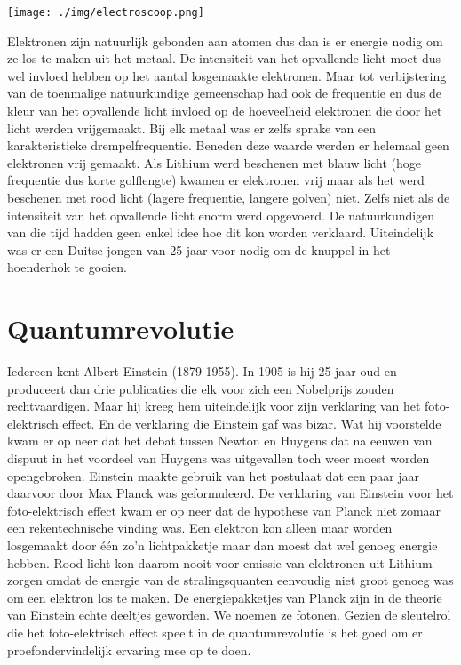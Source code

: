{\begin{center}
\leavevmode
\texttt{[image: ./img/electroscoop.png]}
\end{center}

Elektronen zijn natuurlijk gebonden aan atomen dus dan is er energie nodig om ze los te maken uit het metaal. De intensiteit van het opvallende licht moet dus wel invloed hebben op het aantal losgemaakte elektronen. Maar tot verbijstering van de toenmalige natuurkundige gemeenschap had ook de frequentie en dus de kleur van het opvallende licht invloed op de hoeveelheid elektronen die door het licht werden vrijgemaakt. Bij elk metaal was er zelfs sprake van een karakteristieke drempelfrequentie. Beneden deze waarde werden er helemaal geen elektronen vrij gemaakt. Als Lithium werd beschenen met blauw licht (hoge frequentie dus korte golflengte) kwamen er elektronen vrij maar als het werd beschenen met rood licht (lagere frequentie, langere golven) niet. Zelfs niet als de intensiteit van het opvallende licht enorm werd opgevoerd. De natuurkundigen van die tijd hadden geen enkel idee hoe dit kon worden verklaard. Uiteindelijk was er een Duitse jongen van 25 jaar voor nodig om de knuppel in het hoenderhok te gooien.

\section{Quantumrevolutie}
Iedereen kent Albert Einstein (1879-1955). In 1905 is hij 25 jaar oud en produceert dan drie publicaties die elk voor zich een Nobelprijs zouden rechtvaardigen. Maar hij kreeg hem uiteindelijk voor zijn verklaring van het foto-elektrisch effect. En de verklaring die Einstein gaf was bizar. Wat hij voorstelde kwam er op neer dat het debat tussen Newton en Huygens dat na eeuwen van dispuut in het voordeel van Huygens was uitgevallen toch weer moest worden opengebroken. Einstein maakte gebruik van het postulaat dat een paar jaar daarvoor door Max Planck was geformuleerd. De verklaring van Einstein voor het foto-elektrisch effect kwam er op neer dat de hypothese van Planck niet zomaar een rekentechnische vinding was. Een elektron kon alleen maar worden losgemaakt door \'e\'en zo'n lichtpakketje maar dan moest dat wel genoeg energie hebben. Rood licht kon daarom nooit voor emissie van elektronen uit Lithium zorgen omdat de energie van de stralingsquanten eenvoudig niet groot genoeg was om een elektron los te maken. 
De energiepakketjes van Planck zijn in de theorie van Einstein echte deeltjes geworden. We noemen ze fotonen.
Gezien de sleutelrol die het foto-elektrisch effect speelt in de quantumrevolutie is het goed om er proefondervindelijk ervaring mee op te doen.

}
